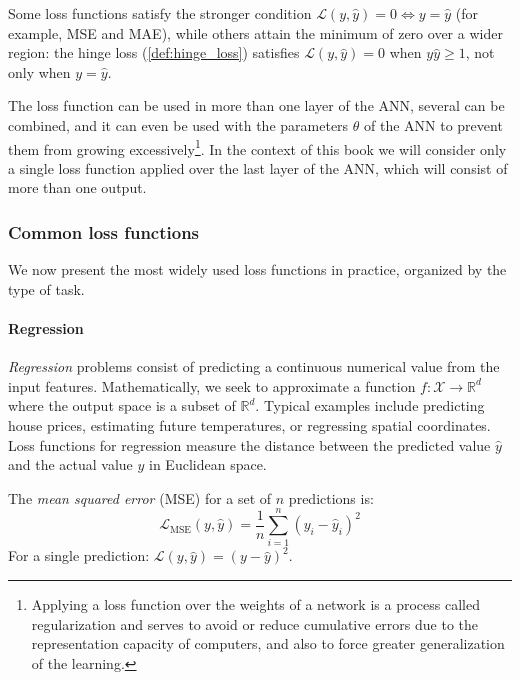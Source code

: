 \begin{remark}
Some loss functions satisfy the stronger condition \(\mathcal{L}(y, \hat{y}) = 0 \iff y = \hat{y}\) (for example, MSE and MAE), while others attain the minimum of zero over a wider region: the hinge loss (\autoref{def:hinge_loss}) satisfies \(\mathcal{L}(y, \hat{y}) = 0\) when \(y \hat{y} \geq 1\), not only when \(y = \hat{y}\).
\end{remark}

The loss function can be used in more than one layer of the \gls{ANN}, several can be combined, and it can even be used with the parameters \(\theta\) of the \gls{ANN} to prevent them from growing excessively\footnote{Applying a loss function over the weights of a network is a process called regularization and serves to avoid or reduce cumulative errors due to the representation capacity of computers, and also to force greater generalization of the learning.}. In the context of this book we will consider only a single loss function applied over the last layer of the \gls{ANN}, which will consist of more than one output.


\subsubsection{Common loss functions}

We now present the most widely used loss functions in practice, organized by the type of task.

\paragraph{Regression}

\textit{Regression} problems consist of predicting a continuous numerical value from the input features. Mathematically, we seek to approximate a function \(f: \mathcal{X} \to \mathbb{R}^d\) where the output space is a subset of \(\mathbb{R}^d\). Typical examples include predicting house prices, estimating future temperatures, or regressing spatial coordinates. Loss functions for regression measure the distance between the predicted value \(\hat{y}\) and the actual value \(y\) in Euclidean space.

\begin{definition}\label{def:mse}
	The \textit{mean squared error} (\gls{MSE}) for a set of \(n\) predictions is:
	\[
		\mathcal{L}_{\text{MSE}}(y, \hat{y}) = \frac{1}{n} \sum_{i=1}^{n} (y_i - \hat{y}_i)^2
	\]
	For a single prediction: \(\mathcal{L}(y, \hat{y}) = (y - \hat{y})^2\).
\end{definition}

